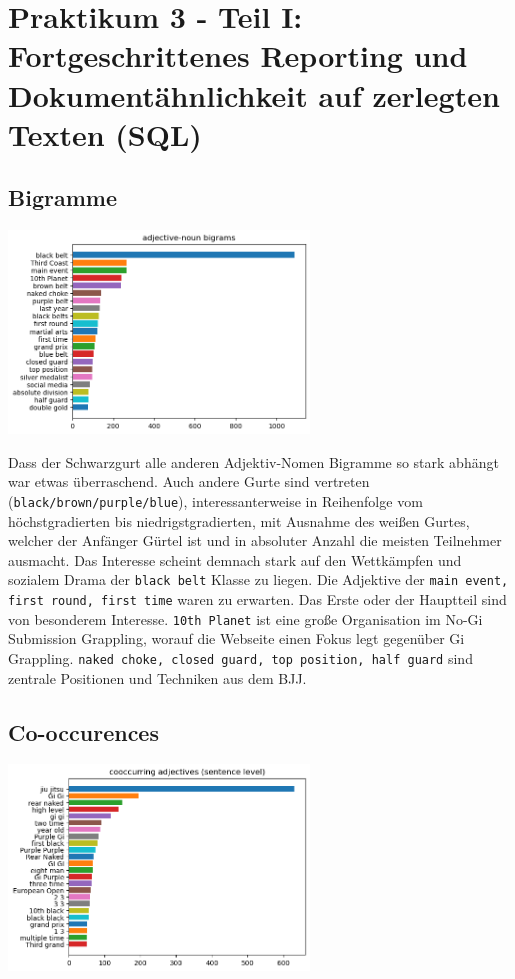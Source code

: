 \newpage
\section{Praktikum 3 - Teil I: Fortgeschrittenes Reporting und Dokumentähnlichkeit auf zerlegten Texten (SQL)}

\subsection{Bigramme}

\begin{center}
\includegraphics[width=0.6\textwidth]{images/adj_noun_bigrams.png}
\end{center}

\noindent Dass der Schwarzgurt alle anderen Adjektiv-Nomen Bigramme so stark abhängt war etwas überraschend. Auch andere Gurte sind vertreten (\texttt{black/brown/purple/blue}), interessanterweise in Reihenfolge vom höchstgradierten bis niedrigstgradierten, mit Ausnahme des wei{\ss}en Gurtes, welcher der Anfänger Gürtel ist und in absoluter Anzahl die meisten Teilnehmer ausmacht. Das Interesse scheint demnach stark auf den Wettkämpfen und sozialem Drama der \texttt{black belt} Klasse zu liegen. Die Adjektive der \texttt{main event, first round, first time} waren zu erwarten. Das Erste oder der Hauptteil sind von besonderem Interesse. \texttt{10th Planet} ist eine gro{\ss}e Organisation im No-Gi Submission Grappling, worauf die Webseite einen Fokus legt gegenüber Gi Grappling. \texttt{naked choke, closed guard, top position, half guard} sind zentrale Positionen und Techniken aus dem BJJ.

\subsection{Co-occurences}

\begin{center}
\includegraphics[width=0.6\textwidth]{images/coocc_adj.png}
\end{center}

